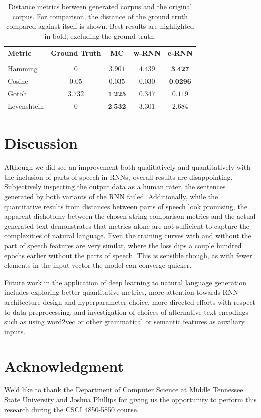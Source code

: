 \documentclass[conference]{IEEEtran}
\begin{document}
\begin{table}[!htbp]
\caption{Distance metrics between generated corpus and the original corpus.  For comparison, the distance of the ground truth compared against itself is shown.  Best results are highlighted in bold, excluding the ground truth.}
\label{tab:results_table}
\begin{center}
\begin{tabular}{lcccc}

Metric & Ground Truth & MC & w-RNN & e-RNN\\
\hline{}\\
Hamming & $0$ & $3.901$ & $4.439$ & $\textbf{3.427}$\\
Cosine & $0.05$ & $0.035$ & $0.030$ & $\textbf{0.0296}$\\
Gotoh & $3.732$ & $\textbf{1.225}$ & $0.347$ & $0.119$\\
Levenshtein & $0$ & $\textbf{2.532}$ & $3.301$ & $2.684$\\

\end{tabular}
\end{center}
\vspace{-1em}
\end{table}


\section{Discussion}

Although we did see an improvement both qualitatively and quantitatively with the inclusion of parts of speech in RNNs, overall results are disappointing.  Subjectively inspecting the output data as a human rater, the sentences generated by both variants of the RNN failed.  Additionally, while the quantitative results from distances between parts of speech look promising, the apparent dichotomy between the chosen string comparison metrics and the actual generated text demonstrates that metrics alone are not sufficient to capture the complexities of natural language.  Even the training curves with and without the part of speech features are very similar, where the loss dips a couple hundred epochs earlier without the parts of speech.  This is sensible though, as with fewer elements in the input vector the model can converge quicker.

Future work in the application of deep learning to natural language generation includes exploring better quantitative metrics, more attention towards RNN architecture design and hyperparameter choice, more directed efforts with respect to data preprocessing, and investigation of choices of alternative text encodings such as using word2vec or other grammatical or semantic features as auxiliary inputs.

\section*{Acknowledgment}

We'd like to thank the Department of Computer Science at Middle Tennessee State University and Joshua Phillips for giving us the opportunity to perform this research during the CSCI 4850-5850 course.




\end{document}
